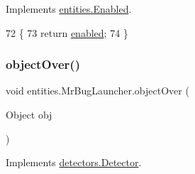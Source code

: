 Implements \mbox{\hyperlink{interfaceentities_1_1_enabled_a3d453026138fed321aed73816b331b49}{entities.\+Enabled}}.


\begin{DoxyCode}
72                                \{
73         \textcolor{keywordflow}{return} \mbox{\hyperlink{classentities_1_1_mr_bug_launcher_a7a137e2093be1b7ebc830d8c10db42b1}{enabled}};
74     \}
\end{DoxyCode}
\mbox{\label{classentities_1_1_mr_bug_launcher_a036f3d0b9c8faafa000c44a34ca77b2e}} 
\subsubsection{\texorpdfstring{object\+Over()}{objectOver()}}
{\footnotesize\ttfamily void entities.\+Mr\+Bug\+Launcher.\+object\+Over (\begin{DoxyParamCaption}\item[{Object}]{obj }\end{DoxyParamCaption})\hspace{0.3cm}{\ttfamily [inline]}}



Implements \mbox{\hyperlink{interfacedetectors_1_1_detector_ab35eeb78e8216f8100d4651993668d44}{detectors.\+Detector}}.


